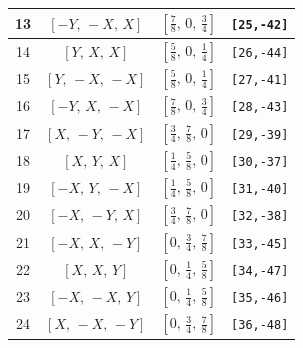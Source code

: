\documentclass[fleqn,8pt]{jsarticle}
\begin{document}
\begin{longtable}{cccc}
13 & $\left[ - Y,\, - X,\, X \right]$ & $\left[ \frac{7}{8},\, 0,\, \frac{3}{4} \right]$ & {\tt [25,-42]} \\ \hline
14 & $\left[ Y,\, X,\, X \right]$ & $\left[ \frac{5}{8},\, 0,\, \frac{1}{4} \right]$ & {\tt [26,-44]} \\ \hline
15 & $\left[ Y,\, - X,\, - X \right]$ & $\left[ \frac{5}{8},\, 0,\, \frac{1}{4} \right]$ & {\tt [27,-41]} \\ \hline
16 & $\left[ - Y,\, X,\, - X \right]$ & $\left[ \frac{7}{8},\, 0,\, \frac{3}{4} \right]$ & {\tt [28,-43]} \\ \hline
17 & $\left[ X,\, - Y,\, - X \right]$ & $\left[ \frac{3}{4},\, \frac{7}{8},\, 0 \right]$ & {\tt [29,-39]} \\ \hline
18 & $\left[ X,\, Y,\, X \right]$ & $\left[ \frac{1}{4},\, \frac{5}{8},\, 0 \right]$ & {\tt [30,-37]} \\ \hline
19 & $\left[ - X,\, Y,\, - X \right]$ & $\left[ \frac{1}{4},\, \frac{5}{8},\, 0 \right]$ & {\tt [31,-40]} \\ \hline
20 & $\left[ - X,\, - Y,\, X \right]$ & $\left[ \frac{3}{4},\, \frac{7}{8},\, 0 \right]$ & {\tt [32,-38]} \\ \hline
21 & $\left[ - X,\, X,\, - Y \right]$ & $\left[ 0,\, \frac{3}{4},\, \frac{7}{8} \right]$ & {\tt [33,-45]} \\ \hline
22 & $\left[ X,\, X,\, Y \right]$ & $\left[ 0,\, \frac{1}{4},\, \frac{5}{8} \right]$ & {\tt [34,-47]} \\ \hline
23 & $\left[ - X,\, - X,\, Y \right]$ & $\left[ 0,\, \frac{1}{4},\, \frac{5}{8} \right]$ & {\tt [35,-46]} \\ \hline
24 & $\left[ X,\, - X,\, - Y \right]$ & $\left[ 0,\, \frac{3}{4},\, \frac{7}{8} \right]$ & {\tt [36,-48]} \\
\end{longtable}
\renewcommand{\arraystretch}{1.2}
\end{document}
